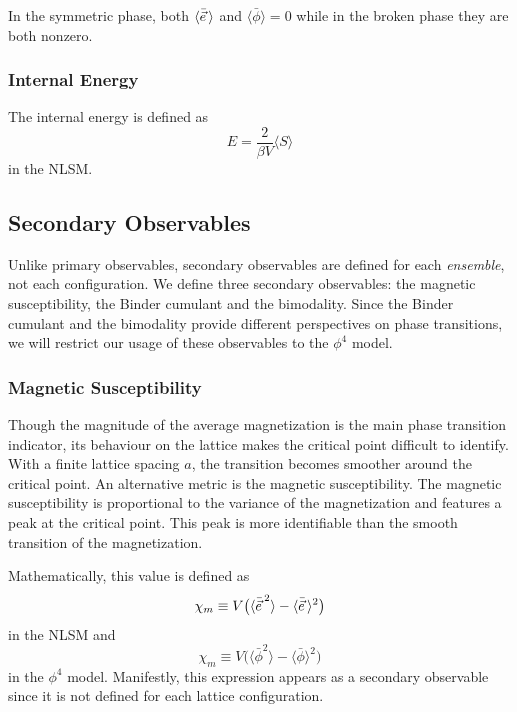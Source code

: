 In the symmetric phase, both $\langle \bar{\vec e}\, \rangle$ and $\langle \bar\phi \rangle = 0$ while in the broken phase they are both nonzero.

\subsubsection{Internal Energy}
The internal energy is defined as \cite{berg1981}
\begin{equation}
    E = \frac{2}{\beta V} \langle S \rangle
\end{equation}
in the NLSM.


\subsection{Secondary Observables}
Unlike primary observables, secondary observables are defined for each \textit{ensemble}, not each configuration. We define three secondary observables: the magnetic susceptibility, the Binder cumulant and the bimodality. Since the Binder cumulant and the bimodality provide different perspectives on phase transitions, we will restrict our usage of these observables to the $\phi^4$ model.

\subsubsection{Magnetic Susceptibility}
Though the magnitude of the average magnetization is the main phase transition indicator, its behaviour on the lattice makes the critical point difficult to identify. With a finite lattice spacing $a$, the transition becomes smoother around the critical point. An alternative metric is the magnetic susceptibility. The magnetic susceptibility is proportional to the variance of the magnetization and features a peak at the critical point. This peak is more identifiable than the smooth transition of the magnetization. 

Mathematically, this value is defined as 
\begin{equation}
    \chi_m \equiv V \big(\langle {\bar{\vec e}\,}^2 \rangle - \langle \bar{\vec e}\, \rangle^2\big)
\end{equation}
in the NLSM and
\begin{equation}
    \chi_m \equiv V \big(\langle {\bar\phi}^2 \rangle - \langle \bar\phi \rangle^2\big)
\end{equation}
in the $\phi^4$ model. Manifestly, this expression appears as a secondary observable since it is not defined for each lattice configuration. 

